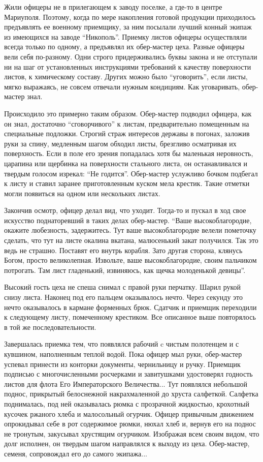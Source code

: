 Жили офицеры не в прилегающем к заводу поселке, а где-то в центре Мариуполя.
Поэтому, когда по мере накопления готовой продукции приходилось предъявлять ее
военному приемщику, за ним посылали лучший конный экипаж из имеющихся на заводе
\enquote{Никополь}. Приемку листов офицеры осуществляли всегда только по одному, а
предъявлял их обер-мастер цеха. Разные офицеры вели себя по-разному. Одни
строго придерживались буквы закона и не отступали ни на шаг от установленных
инструкциями требований к качеству поверхности листов, к химическому составу.
Других можно было \enquote{уговорить}, если листы, мягко выражаясь, не совсем отвечали
нужным кондициям. Как уговаривать, обер-мастер знал.

Происходило это примерно таким образом. Обер-мастер подводил офицера, как он
знал, достаточно \enquote{сговорчивого} к листам, предварительно помещенным на
специальные подложки. Строгий страж интересов державы в погонах, заложив руки
за спину, медленным шагом обходил листы, брезгливо осматривая их поверхность.
Если в поле его зрения попадалась хотя бы маленькая неровность, царапина или
щербинка на поверхности стального листа, он останавливался и твердым голосом
изрекал: \enquote{Не годится}. Обер-мастер услужливо бочком подбегал к листу и ставил
заранее приготовленным куском мела крестик. Такие отметки могли появиться на
одном или нескольких листах.

Закончив осмотр, офицер делал вид, что уходит. Тогда-то и пускал в ход свое
искусство поднаторевший в таких делах обер-мастер. \enquote{Ваше высокоблагородие,
окажите любезность, задержитесь. Тут ваше высокоблагородие велели пометочку
сделать, что тут на листе окалина вкатана, малюсенький закат получился. Так это
ведь не страшно. Поставят его внутрь корабля. Зато другая сторона, клянусь
Богом, просто великолепная. Извольте, ваше высокоблагородие, своим пальчиком
потрогать. Там лист гладенький, извиняюсь, как щечка молоденькой девицы}.

Высокий гость цеха не спеша снимал с правой руки перчатку. Шарил рукой снизу
листа. Наконец под его пальцем оказывалось нечто. Через секунду это нечто
оказывалось в кармане форменных брюк. Сдатчик и приемщик переходили к
следующему листу, помеченному крестиком. Все описанное выше повторялось в той
же последовательности.

Завершалась приемка тем, что появлялся рабочий c чистым полотенцем и с
кувшином, наполненным теплой водой. Пока офицер мыл руки, обер-мастер успевал
принести из конторки документы, чернильницу и ручку. Приемщик подписью с
многочисленными росчерками и завитушками удостоверял годность листов для флота
Его Императорского Величества... Тут появлялся небольшой поднос, прикрытый
белоснежной накрахмаленной до хруста салфеткой. Салфетка поднималась, под ней
оказывалась рюмка с прозрачной жидкостью, крохотный кусочек ржаного хлеба и
малосольный огурчик. Офицер привычным движением опрокидывал себе в рот
содержимое рюмки, нюхал хлеб и, вернув его на поднос не тронутым, закусывал
хрустящим огурчиком. Изображая всем своим видом, что долг исполнен, он твердым
шагом направлялся к выходу из цеха. Обер-мастер, семеня, сопровождал его до
самого экипажа...

